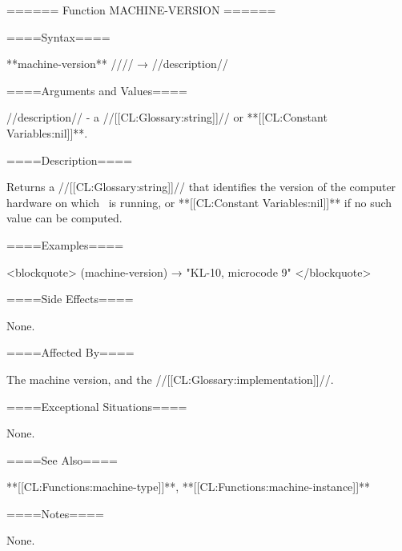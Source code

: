 ====== Function MACHINE-VERSION ======

====Syntax====

**machine-version** //\noargs// → //description//

====Arguments and Values====

//description// - a //[[CL:Glossary:string]]// or **[[CL:Constant Variables:nil]]**.

====Description====

Returns a //[[CL:Glossary:string]]// that identifies the version of the computer hardware on which \clisp\ is running, or **[[CL:Constant Variables:nil]]** if no such value can be computed.

====Examples====

<blockquote> (machine-version) → "KL-10, microcode 9" </blockquote>

====Side Effects====

None.

====Affected By====

The machine version, and the //[[CL:Glossary:implementation]]//.

====Exceptional Situations====

None.

====See Also====

**[[CL:Functions:machine-type]]**, **[[CL:Functions:machine-instance]]**

====Notes====

None.

